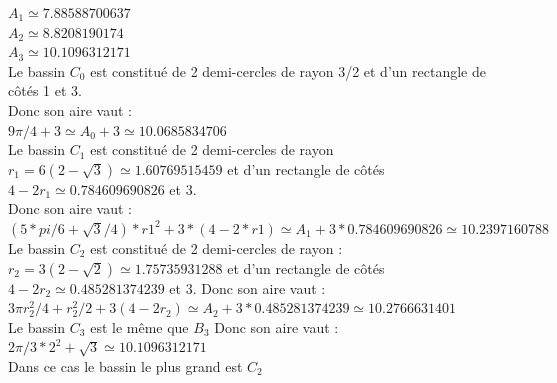\documentclass[a4paper,11pt]{book}
\begin{document}
$A_1\simeq 7.88588700637$\\
$A_2\simeq 8.8208190174$\\
$A_3\simeq 10.1096312171$\\
Le bassin $C_0$ est constitu\'e de 2 demi-cercles de rayon 3/2 et d'un 
rectangle de c\^ot\'es 1 et 3.\\
Donc son aire vaut :\\
 $9\pi/4+3 \simeq A_0+3 \simeq 10.0685834706$\\
Le bassin $C_1$ est constitu\'e de 2 demi-cercles de rayon 
$r_1=6(2-\sqrt 3)\simeq 1.60769515459$ et d'un 
rectangle de c\^ot\'es $4-2r_1\simeq 0.784609690826$ et 3.\\
Donc son aire vaut :\\
 $(5*pi/6+\sqrt 3/4)*r1^2+3*(4-2*r1)\simeq A_1+3*0.784609690826\simeq 10.2397160788$\\
Le bassin $C_2$ est constitu\'e de 2 demi-cercles de rayon :
$r_2=3(2-\sqrt 2)\simeq 1.75735931288$ et d'un 
rectangle de c\^ot\'es $4-2r_2\simeq 0.485281374239$ et 3.
Donc son aire vaut :\\
$3\pi r_2^2/4+r_2^2/2+3(4-2r_2)\simeq A_2+3*0.485281374239\simeq 10.2766631401$\\
Le bassin $C_3$ est le m\^eme que $B_3$
Donc son aire vaut : $2\pi/3*2^2+\sqrt 3 \simeq 10.1096312171$\\
Dans ce cas le bassin le plus grand est $C_2$\\
\end{document}
